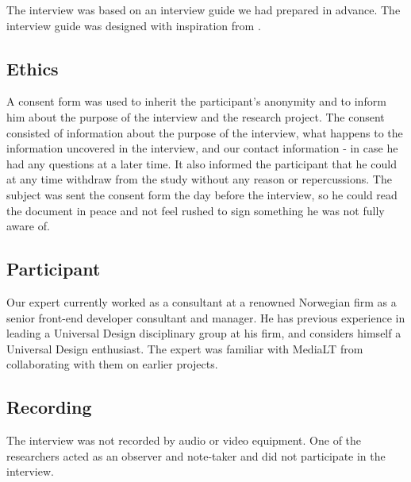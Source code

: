 The interview was based on an interview guide we had prepared in advance. The interview guide was designed with inspiration from \textcite{tone_nordbo_introduksjon_2017}.

\subsection{Ethics}
A consent form was used to inherit the participant's anonymity and to inform him about the purpose of the interview and the research project. The consent consisted of information about the purpose of the interview, what happens to the information uncovered in the interview, and our contact information - in case he had any questions at a later time. It also informed the participant that he could at any time withdraw from the study without any reason or repercussions. The subject was sent the consent form the day before the interview, so he could read the document in peace and not feel rushed to sign something he was not fully aware of.

\subsection{Participant}
Our expert currently worked as a consultant at a renowned Norwegian firm as a senior front-end developer consultant and manager. He has previous experience in leading a Universal Design disciplinary group at his firm, and considers himself a Universal Design enthusiast. The expert was familiar with MediaLT from collaborating with them on earlier projects.

\subsection{Recording}
The interview was not recorded by audio or video equipment. One of the researchers acted as an observer and note-taker and did not participate in the interview. 

